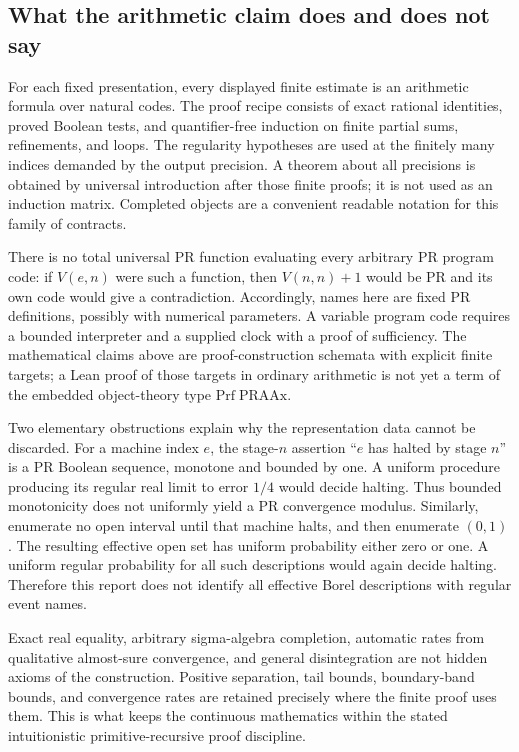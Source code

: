 \subsection{What the arithmetic claim does and does not say}

For each fixed presentation, every displayed finite estimate is an arithmetic
formula over natural codes. The proof recipe consists of exact rational
identities, proved Boolean tests, and quantifier-free induction on finite
partial sums, refinements, and loops. The regularity hypotheses are used at
the finitely many indices demanded by the output precision. A theorem about
all precisions is obtained by universal introduction after those finite
proofs; it is not used as an induction matrix. Completed objects are a
convenient readable notation for this family of contracts.

There is no total universal PR function evaluating every arbitrary PR
program code: if $V(e,n)$ were such a function, then $V(n,n)+1$ would be PR
and its own code would give a contradiction. Accordingly, names here are
fixed PR definitions, possibly with numerical parameters. A variable program
code requires a bounded interpreter and a supplied clock with a proof of
sufficiency. The mathematical claims above are proof-construction schemata
with explicit finite targets; a Lean proof of those targets in ordinary
arithmetic is not yet a term of the embedded object-theory type
$\mathrm{Prf}\;\mathrm{PRAAx}$.

Two elementary obstructions explain why the representation data cannot be
discarded. For a machine index $e$, the stage-$n$ assertion ``$e$ has halted
by stage $n$'' is a PR Boolean sequence, monotone and bounded by one. A
uniform procedure producing its regular real limit to error $1/4$ would
decide halting. Thus bounded monotonicity does not uniformly yield a PR
convergence modulus. Similarly, enumerate no open interval until that machine
halts, and then enumerate $(0,1)$. The resulting effective open set has
uniform probability either zero or one. A uniform regular probability for
all such descriptions would again decide halting. Therefore this report does
not identify all effective Borel descriptions with regular event names.

Exact real equality, arbitrary sigma-algebra completion, automatic rates from
qualitative almost-sure convergence, and general disintegration are not hidden
axioms of the construction. Positive separation, tail bounds, boundary-band
bounds, and convergence rates are retained precisely where the finite proof
uses them. This is what keeps the continuous mathematics within the stated
intuitionistic primitive-recursive proof discipline.

